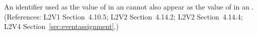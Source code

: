 An identifier used as the value of  in an \EventAssignment
cannot also appear as the value of  in an \AssignmentRule.
(References: L2V1 Section~4.10.5; L2V2 Section~4.14.2; L2V2 Section~4.14.4;
L2V4 Section~\ref{sec:eventassignment}.)

